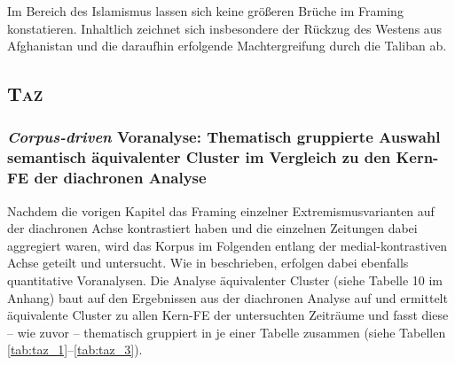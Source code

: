 Im Bereich des Islamismus lassen sich keine größeren Brüche im Framing konstatieren. Inhaltlich zeichnet sich insbesondere der Rückzug des Westens aus Afghanistan und die daraufhin erfolgende Machtergreifung durch die Taliban ab.

\subsection{\texorpdfstring{\textsc{Taz}}{Taz}}\label{taz}


\subsubsection{\texorpdfstring{\emph{Corpus-driven} Voranalyse: Thematisch gruppierte Auswahl semantisch äquivalenter Cluster im Vergleich zu den Kern-FE der diachronen Analyse}{Corpus-driven Voranalyse: Thematisch gruppierte Auswahl semantisch äquivalenter Cluster im Vergleich zu den Kern-FE der diachronen Analyse}}\label{corpus-driven-voranalyse-thematisch-gruppierte-auswahl-semantisch-aequivalenter-cluster-im-vergleich-zu-den-kern-fe-der-diachronen-analyse}
Nachdem die vorigen Kapitel das Framing einzelner Extremismusvarianten auf der diachronen Achse kontrastiert haben und die einzelnen Zeitungen dabei aggregiert waren, wird das Korpus im Folgenden entlang der medial-kontrastiven Achse geteilt und untersucht. Wie in  beschrieben, erfolgen dabei ebenfalls quantitative Voranalysen. Die Analyse äquivalenter Cluster (siehe Tabelle 10 im Anhang) baut auf den Ergebnissen aus der diachronen Analyse auf und ermittelt äquivalente Cluster zu allen Kern-FE der untersuchten Zeiträume und fasst diese -- wie zuvor -- thematisch gruppiert in je einer Tabelle zusammen (siehe Tabellen \ref{tab:taz_1}--\ref{tab:taz_3}).


